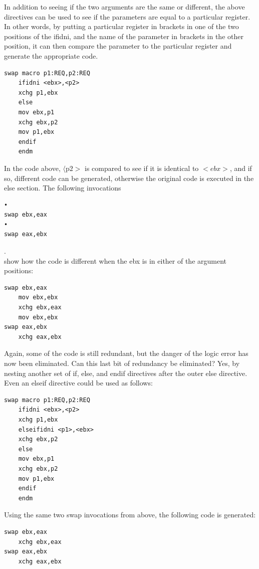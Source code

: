 \documentclass[10pt]{article}
\begin{document}
In addition to seeing if the two arguments are the same or different, the above directives can be used to see if the parameters are equal to a particular register. In other words, by putting a particular register in brackets in one of the two positions of the ifidni, and the name of the parameter in brackets in the other position, it can then compare the parameter to the particular register and generate the appropriate code.

\begin{verbatim}
swap macro p1:REQ,p2:REQ
    ifidni <ebx>,<p2>
    xchg p1,ebx
    else
    mov ebx,p1
    xchg ebx,p2
    mov p1,ebx
    endif
    endm
\end{verbatim}

In the code above, $\langle\mathrm{p} 2>$ is compared to see if it is identical to $<e b x>$, and if so, different code can be generated, otherwise the original code is executed in the else section. The following invocations

\begin{verbatim}
•
swap ebx,eax
•
swap eax,ebx
\end{verbatim}

.\\
show how the code is different when the ebx is in either of the argument positions:

\begin{verbatim}
swap ebx,eax
    mov ebx,ebx
    xchg ebx,eax
    mov ebx,ebx
swap eax,ebx
    xchg eax,ebx
\end{verbatim}

Again, some of the code is still redundant, but the danger of the logic error has now been eliminated. Can this last bit of redundancy be eliminated? Yes, by nesting another set of if, else, and endif directives after the outer else directive. Even an elseif directive could be used as follows:

\begin{verbatim}
swap macro p1:REQ,p2:REQ
    ifidni <ebx>,<p2>
    xchg p1,ebx
    elseifidni <p1>,<ebx>
    xchg ebx,p2
    else
    mov ebx,p1
    xchg ebx,p2
    mov p1,ebx
    endif
    endm
\end{verbatim}

Using the same two swap invocations from above, the following code is generated:

\begin{verbatim}
swap ebx,eax
    xchg ebx,eax
swap eax,ebx
    xchg eax,ebx
\end{verbatim}
\end{document}
